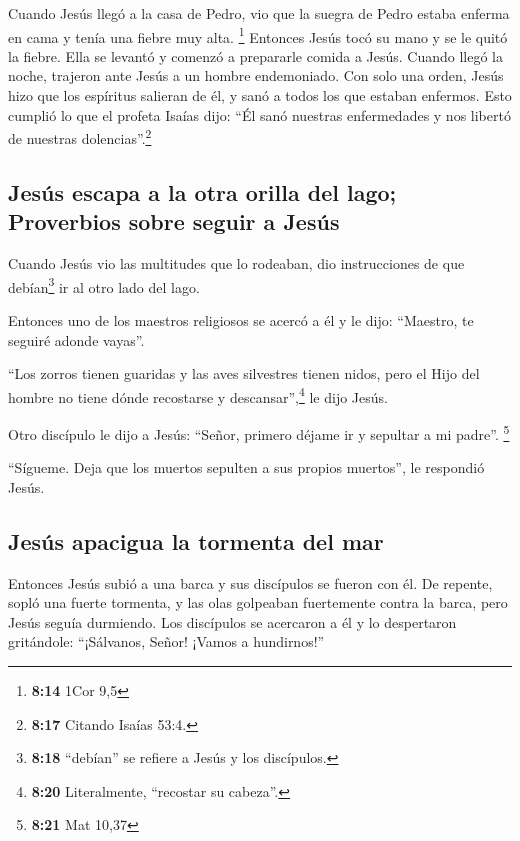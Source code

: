  Cuando Jesús llegó a la casa de Pedro, vio que la suegra
de Pedro estaba enferma en cama y tenía una fiebre muy alta. \footnote{\textbf{8:14}
  1Cor 9,5}  Entonces Jesús tocó su mano y se le quitó la
fiebre. Ella se levantó y comenzó a prepararle comida a Jesús.
 Cuando llegó la noche, trajeron ante Jesús a un hombre
endemoniado. Con solo una orden, Jesús hizo que los espíritus salieran
de él, y sanó a todos los que estaban enfermos.  Esto
cumplió lo que el profeta Isaías dijo: ``Él sanó nuestras enfermedades y
nos libertó de nuestras dolencias''.\footnote{\textbf{8:17} Citando
  Isaías 53:4.}

\hypertarget{jesuxfas-escapa-a-la-otra-orilla-del-lago-proverbios-sobre-seguir-a-jesuxfas}{%
\subsection{Jesús escapa a la otra orilla del lago; Proverbios sobre
seguir a
Jesús}\label{jesuxfas-escapa-a-la-otra-orilla-del-lago-proverbios-sobre-seguir-a-jesuxfas}}

 Cuando Jesús vio las multitudes que lo rodeaban, dio
instrucciones de que debían\footnote{\textbf{8:18} ``debían'' se refiere
  a Jesús y los discípulos.} ir al otro lado del lago.

 Entonces uno de los maestros religiosos se acercó a él y
le dijo: ``Maestro, te seguiré adonde vayas''.

 ``Los zorros tienen guaridas y las aves silvestres
tienen nidos, pero el Hijo del hombre no tiene dónde recostarse y
descansar'',\footnote{\textbf{8:20} Literalmente, ``recostar su
  cabeza''.} le dijo Jesús.

 Otro discípulo le dijo a Jesús: ``Señor, primero déjame
ir y sepultar a mi padre''. \footnote{\textbf{8:21} Mat 10,37}

 ``Sígueme. Deja que los muertos sepulten a sus propios
muertos'', le respondió Jesús.

\hypertarget{jesuxfas-apacigua-la-tormenta-del-mar}{%
\subsection{Jesús apacigua la tormenta del
mar}\label{jesuxfas-apacigua-la-tormenta-del-mar}}

 Entonces Jesús subió a una barca y sus discípulos se
fueron con él.  De repente, sopló una fuerte tormenta, y
las olas golpeaban fuertemente contra la barca, pero Jesús seguía
durmiendo.  Los discípulos se acercaron a él y lo
despertaron gritándole: ``¡Sálvanos, Señor! ¡Vamos a hundirnos!''

